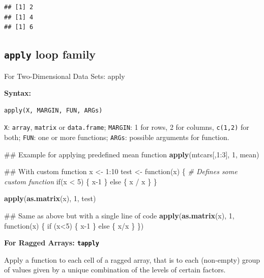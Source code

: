 \documentclass[]{article}
\newenvironment{Shaded}{\begin{snugshade}}{\end{snugshade}}
\newcommand{\KeywordTok}[1]{\textcolor[rgb]{0.13,0.29,0.53}{\textbf{{#1}}}}
\newcommand{\DecValTok}[1]{\textcolor[rgb]{0.00,0.00,0.81}{{#1}}}
\newcommand{\StringTok}[1]{\textcolor[rgb]{0.31,0.60,0.02}{{#1}}}
\newcommand{\CommentTok}[1]{\textcolor[rgb]{0.56,0.35,0.01}{\textit{{#1}}}}
\newcommand{\NormalTok}[1]{{#1}}
\numberwithin{equation}{section}
\begin{document}
\begin{verbatim}
## [1] 2
## [1] 4
## [1] 6
\end{verbatim}

\subsection{\texorpdfstring{\texttt{apply} loop
family}{apply loop family}}\label{apply-loop-family}

For Two-Dimensional Data Sets: apply

\textbf{Syntax:}

\begin{verbatim}
apply(X, MARGIN, FUN, ARGs)
\end{verbatim}

\texttt{X}: \texttt{array}, \texttt{matrix} or \texttt{data.frame};
\texttt{MARGIN}: 1 for rows, 2 for columns, \texttt{c(1,2)} for both;
\texttt{FUN}: one or more functions; \texttt{ARGs}: possible arguments
for function.

\begin{Shaded}
\begin{Highlighting}[]
\NormalTok{## Example for applying predefined mean function}
\KeywordTok{apply}\NormalTok{(mtcars[,}\DecValTok{1}\NormalTok{:}\DecValTok{3}\NormalTok{], }\DecValTok{1}\NormalTok{, mean)}

\NormalTok{## With custom function}
\NormalTok{x <-}\StringTok{ }\DecValTok{1}\NormalTok{:}\DecValTok{10}
\NormalTok{test <-}\StringTok{ }\NormalTok{function(x) \{ }\CommentTok{# Defines some custom function}
    \NormalTok{if(x <}\StringTok{ }\DecValTok{5}\NormalTok{) \{}
        \NormalTok{x}\DecValTok{-1}
    \NormalTok{\} else \{}
        \NormalTok{x /}\StringTok{ }\NormalTok{x}
    \NormalTok{\}}
\NormalTok{\} }

\KeywordTok{apply}\NormalTok{(}\KeywordTok{as.matrix}\NormalTok{(x), }\DecValTok{1}\NormalTok{, test) }

\NormalTok{## Same as above but with a single line of code}
\KeywordTok{apply}\NormalTok{(}\KeywordTok{as.matrix}\NormalTok{(x), }\DecValTok{1}\NormalTok{, function(x) \{ if (x<}\DecValTok{5}\NormalTok{) \{ x}\DecValTok{-1} \NormalTok{\} else \{ x/x \} \})}
\end{Highlighting}
\end{Shaded}

\textbf{For Ragged Arrays: \texttt{tapply}}

Apply a function to each cell of a ragged array, that is to each
(non-empty) group of values given by a unique combination of the levels
of certain factors.
\end{document}
